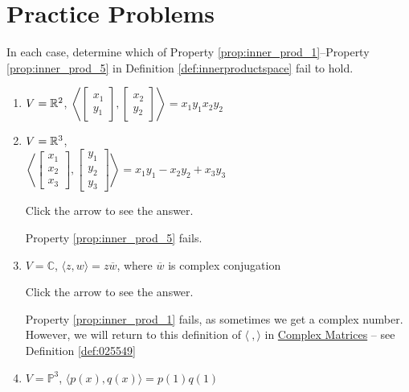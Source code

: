 \documentclass{ximera}
\begin{document}
\section*{Practice Problems}

\begin{problem}\label{prob:inner_prod_1}
In each case, determine which of  Property \ref{prop:inner_prod_1}--Property \ref{prop:inner_prod_5} in Definition \ref{def:innerproductspace} fail to hold.

\begin{enumerate} 
\item $V = \mathbb{R}^2$, $\left\langle \begin{bmatrix}x_1\\ y_1\end{bmatrix}, \begin{bmatrix}x_2\\ y_2\end{bmatrix} \right\rangle = x_1y_1x_2y_2$

\item $V = \mathbb{R}^3$, \\$\left\langle \begin{bmatrix}x_1\\ x_2\\ x_3\end{bmatrix}, \begin{bmatrix}y_1\\ y_2\\ y_3\end{bmatrix} \right\rangle = x_1y_1 - x_2y_2 + x_3y_3$

Click the arrow to see the answer.
\begin{expandable}
Property \ref{prop:inner_prod_5} fails.
\end{expandable}

\item $V = \mathbb{C}$, $\langle z, w \rangle = z\overline{w}$, where $\overline{w}$ is complex
conjugation

Click the arrow to see the answer.
\begin{expandable}
Property \ref{prop:inner_prod_1} fails, as sometimes we get a complex number.  However, we will return to this definition of $\langle\ , \rangle$ in \href{https://ximera.osu.edu/linearalgebradzv3/LinearAlgebraInteractiveIntro/RTH-0050/main}{Complex Matrices} -- see Definition \ref{def:025549}
\end{expandable}

\item $V = \mathbb{P}^3$, $\langle p(x), q(x) \rangle = p(1)q(1)$


\end{enumerate}
\end{problem}
\end{document}
